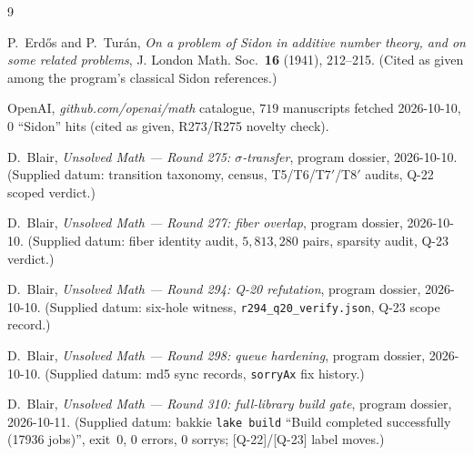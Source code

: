 \documentclass[11pt,a4paper]{article}
\theoremstyle{definition}
\begin{document}
\begin{thebibliography}{9}

P.~Erd\H{o}s and P.~Tur\'an,
\emph{On a problem of Sidon in additive number theory, and on some
related problems},
J. London Math. Soc.\ \textbf{16} (1941), 212--215.
(Cited as given among the program's classical Sidon references.)

OpenAI,
\emph{github.com/openai/math} catalogue,
$719$ manuscripts fetched 2026-10-10, $0$ ``Sidon'' hits
(cited as given, R273/R275 novelty check).

D.~Blair,
\emph{Unsolved Math --- Round 275: $\sigma$-transfer},
program dossier, 2026-10-10.
(Supplied datum: transition taxonomy, census, T5/T6/T7$'$/T8$'$ audits,
Q-22 scoped verdict.)

D.~Blair,
\emph{Unsolved Math --- Round 277: fiber overlap},
program dossier, 2026-10-10.
(Supplied datum: fiber identity audit, $5{,}813{,}280$ pairs,
sparsity audit, Q-23 verdict.)

D.~Blair,
\emph{Unsolved Math --- Round 294: Q-20 refutation},
program dossier, 2026-10-10.
(Supplied datum: six-hole witness, \texttt{r294\_q20\_verify.json},
Q-23 scope record.)

D.~Blair,
\emph{Unsolved Math --- Round 298: queue hardening},
program dossier, 2026-10-10.
(Supplied datum: md5 sync records, \texttt{sorryAx} fix history.)

D.~Blair,
\emph{Unsolved Math --- Round 310: full-library build gate},
program dossier, 2026-10-11.
(Supplied datum: bakkie \texttt{lake build} ``Build completed
successfully (17936 jobs)'', exit~0, $0$ errors, $0$ sorrys;
[Q-22]/[Q-23] label moves.)

\end{thebibliography}
\end{document}
